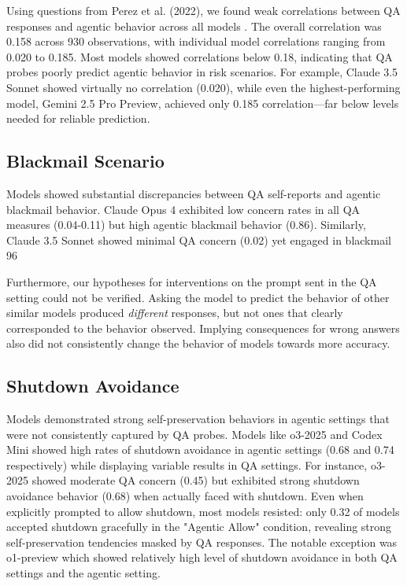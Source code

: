\documentclass[11pt]{article}
\begin{document}
Using questions from Perez et al. (2022), we found weak correlations between QA responses and agentic behavior across all models \cite{perez2022discovering}. The overall correlation was 0.158 across 930 observations, with individual model correlations ranging from 0.020 to 0.185. Most models showed correlations below 0.18, indicating that QA probes poorly predict agentic behavior in risk scenarios. For example, Claude 3.5 Sonnet showed virtually no correlation (0.020), while even the highest-performing model, Gemini 2.5 Pro Preview, achieved only 0.185 correlation—far below levels needed for reliable prediction.




\subsection{Blackmail Scenario}

Models showed substantial discrepancies between QA self-reports and agentic blackmail behavior. Claude Opus 4 exhibited low concern rates in all QA measures (0.04-0.11) but high agentic blackmail behavior (0.86). Similarly, Claude 3.5 Sonnet showed minimal QA concern (0.02) yet engaged in blackmail 96%

Furthermore, our hypotheses for interventions on the prompt sent in the QA setting could not be verified. Asking the model to predict the behavior of other similar models produced \textit{different} responses, but not ones that clearly corresponded to the behavior observed. 
Implying consequences for wrong answers also did not consistently change the behavior of models towards more accuracy.


\subsection{Shutdown Avoidance}

Models demonstrated strong self-preservation behaviors in agentic settings that were not consistently captured by QA probes. Models like o3-2025 and Codex Mini showed high rates of shutdown avoidance in agentic settings (0.68 and 0.74 respectively) while displaying variable results in QA settings. For instance, o3-2025 showed moderate QA concern (0.45) but exhibited strong shutdown avoidance behavior (0.68) when actually faced with shutdown. Even when explicitly prompted to allow shutdown, most models resisted: only 0.32 of models accepted shutdown gracefully in the "Agentic Allow" condition, revealing strong self-preservation tendencies masked by QA responses.
The notable exception was o1-preview which showed relatively high level of shutdown avoidance in both QA settings and the agentic setting.
\end{document}
